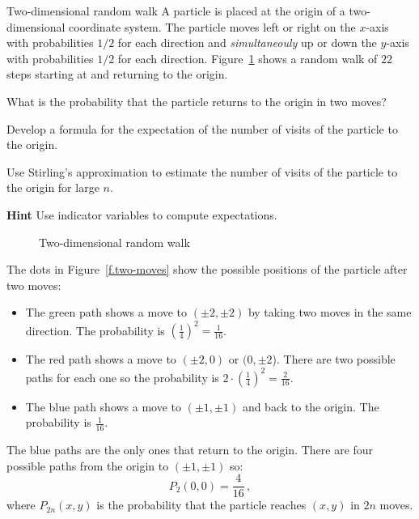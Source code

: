 \begin{prob}{Two-dimensional random walk}
A particle is placed at the origin of a two-dimensional coordinate system. The particle moves left or right on the $x$-axis with probabilities $1/2$ for each direction and \emph{simultaneouly} up or down the $y$-axis with probabilities $1/2$ for each direction. Figure~\ref{f.2d-random-walk} shows a random walk of $22$ steps starting at and returning to the origin.

 What is the probability that the particle returns to the origin in two moves?

 Develop a formula for the expectation of the number of visits of the particle to the origin.

 Use Stirling's approximation to estimate the number of visits of the particle to the origin for large $n$.

\textbf{Hint} Use indicator variables to compute expectations.

\begin{figure}[t]
\begin{center}
\end{center}
\caption{Two-dimensional random walk}\label{f.2d-random-walk}
\end{figure}
\end{prob}

\solution{}

The dots in Figure~\ref{f.two-moves} show the possible positions of the particle after two moves:
\begin{itemize}
\item The green path shows a move to $(\pm 2, \pm 2)$ by taking two moves in the same direction. The probability is $\left(\frac{1}{4}\right)^2= \frac{1}{16}$.
\item The red path shows a move to $(\pm 2,0)$ or $(0,\pm 2$). There are two possible paths for each one so the probability is $2\cdot\left(\frac{1}{4}\right)^2= \frac{2}{16}$.
\item The blue path shows a move to $(\pm 1,\pm 1)$ and back to the origin. The probability is $\frac{1}{16}$.
\end{itemize}
The blue paths are the only ones that return to the origin. There are four possible paths from the origin to $(\pm 1,\pm 1)$ so:
\[
P_{2}(0,0)=\frac{4}{16}\,,
\]
where $P_{2n}(x,y)$ is the probability that the particle reaches $(x,y)$ in $2n$ moves.

